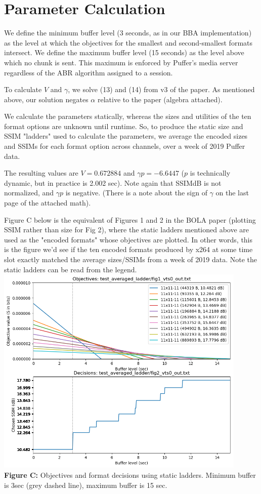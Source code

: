 \documentclass[12pt]{article}
\begin{document}
\section*{Parameter Calculation}
We define the minimum buffer level (3 seconds, as in our BBA implementation) as the level at which the objectives for the smallest and second-smallest formats intersect. We define the maximum buffer level (15 seconds) as the level above which no chunk is sent. This maximum is enforced by Puffer's media server regardless of the ABR algorithm assigned to a session.
 
To calculate $V$ and $\gamma$, we solve (13) and (14) from v3 of the paper. As mentioned above, our solution negates $\alpha$ relative to the paper (algebra attached). 
 
We calculate the parameters statically, whereas the sizes and utilities of the ten format options are unknown until runtime. So, to produce the static size and SSIM "ladders" used to calculate the parameters, we average the encoded sizes and SSIMs for each format option across channels, over a week of 2019 Puffer data. 
 
The resulting values are $V = 0.672884$ and $\gamma p = -6.6447$ ($p$ is technically dynamic, but in practice is 2.002 sec). Note again that SSIMdB is not normalized, and $\gamma p$ is negative. (There is a note about the sign of $\gamma$ on the last page of the attached math). 
 
Figure C  below is the equivalent of Figures 1 and 2 in the BOLA paper (plotting SSIM rather than size for Fig 2), where the static ladders mentioned above are used as the "encoded formats" whose objectives are plotted. In other words, this is the figure we'd see if the ten encoded formats produced by x264 at some time slot exactly matched the average sizes/SSIMs from a week of 2019 data.  Note the static ladders can be read from the legend. \\
\includegraphics[width=0.9\textwidth]{test_averaged_ladder.png} \\
\textbf{Figure C:} Objectives and format decisions using static ladders. Minimum buffer is 3sec (grey dashed line), maximum buffer is 15 sec. 
 
\end{document}

